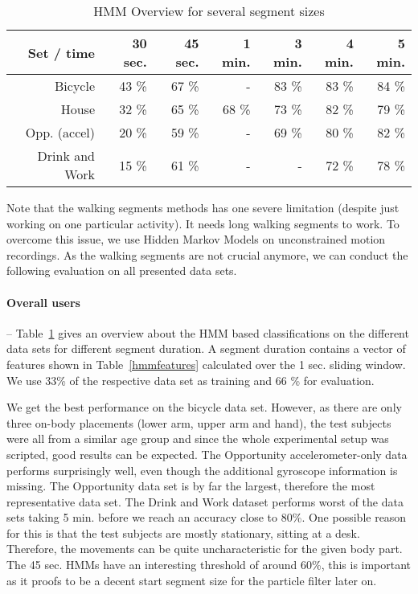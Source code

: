 \begin{table}[!t]
\centering
\caption{HMM Overview for several segment sizes}
\begin{tabular}{r r r r r r r}\toprule
Set / time & 30 sec. & 45 sec. & 1 min. & 3 min. & 4 min. & 5 min.\\
\midrule
Bicycle & 43 \% & 67 \% & -   & 83 \% & 83 \% & 84 \%\\
House & 32 \% & 65 \% & 68 \%  & 73 \% & 82 \% & 79 \%\\
Opp. (accel) & 20 \% & 59 \% & -  & 69 \% & 80 \% & 82 \%\\
Drink and Work & 15 \% & 61 \% & -  & - & 72 \% & 78 \%\\
\bottomrule
\end{tabular}
\label{overview}
\end{table}

Note that the walking segments methods has one severe limitation (despite just working on one particular activity).
It needs long walking segments to work. To overcome this issue,
we use Hidden Markov Models on unconstrained motion recordings.
As the walking segments are not crucial anymore, we can conduct
the following evaluation on all presented data sets.


\paragraph{Overall users}-- Table~\ref{overview} gives an overview about the HMM based classifications
on the different data sets for different segment duration. A segment
duration contains a vector of features shown in Table~\ref{hmmfeatures}
calculated over the 1 sec. sliding window. We use 33\% of the respective data set 
as training and 66 \% for evaluation. 

We get the best performance on the bicycle data set. However, as
there are only three on-body placements (lower arm, upper arm and hand),
the test subjects were all from a similar age group and since the whole
experimental setup was scripted, good results can be expected. 
The Opportunity accelerometer-only data performs surprisingly well,
even though the additional gyroscope information is missing. The Opportunity data set is
by far the largest, therefore the most representative data set. 
  The Drink and Work dataset performs worst of the data sets taking
5 min. before we reach an accuracy close to 80\%.  One possible reason
for this is that the test subjects are mostly stationary, sitting at a desk. 
Therefore, the movements can be quite uncharacteristic for the given body part.
The 45 sec. HMMs have an interesting threshold
of around 60\%, this is important as it proofs to be a decent start segment size 
for the particle filter later on. 


